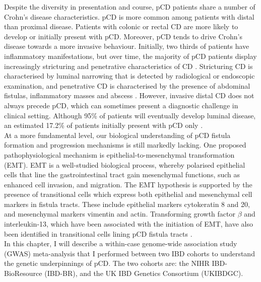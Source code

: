 Despite the diversity in presentation and course, pCD patients share a number of Crohn's disease characteristics. pCD is  more common among patients with distal than proximal disease. Patients with colonic or rectal CD are more likely to develop or initially present with pCD. Moreover, pCD tends to drive Crohn's disease towards a more invasive behaviour. Initially, two thirds of patients have inflammatory manifestations, but over time, the majority of pCD patients display increasingly stricturing and penetrative characteristics of CD \cite{Peyrin-Biroulet2010-mf,Scharl2017-sp}. Stricturing CD is characterised by luminal narrowing that is detected by radiological or endoscopic examination, and penetrative CD is characterised by the presence of abdominal fistulas, inflammatory masses and abscess \cite{Gasche2000-qh}.  However, invasive distal CD does not always precede pCD, which can sometimes present a diagnostic challenge in clinical setting. Although 95\% of patients will eventually develop luminal disease, an estimated 17.2\% of patients initially present with pCD only \cite{Eglinton2012-hh}. \\

At a more fundamental level, our biological understanding of pCD fistula formation and progression mechanisms is still markedly lacking. One proposed pathophysiological mechanism is epithelial-to-mesenchymal transformation (EMT). EMT is a well-studied biological process, whereby polarised epithelial cells that line the gastrointestinal tract gain mesenchymal functions, such as enhanced cell invasion, and migration. The EMT hypothesis is supported by the presence of transitional cells which express both epithelial and mesenchymal cell markers in fistula tracts. These include epithelial markers cytokeratin 8 and 20, and mesenchymal markers vimentin and actin. Transforming growth factor $\beta$ and interleukin-13, which have been associated with the initiation of EMT, have also been identified in transitional cells lining pCD fistula tracts \cite{Scharl2013-uf}. \\

In this chapter, I will describe a within-case genome-wide association study (GWAS) meta-analysis that I performed between two IBD cohorts to understand the genetic underpinnings of pCD. The two cohorts are: the NIHR IBD-BioResource (IBD-BR), and the UK IBD Genetics Consortium (UKIBDGC). \\

